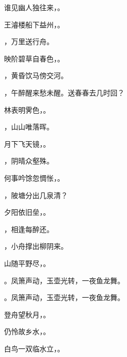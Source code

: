 \documentclass[12pt, a4paper, addpoints]{exam}
\begin{document}
\begin{questions}
\question[1] 谁见幽人独往来，\uline{\qquad\qquad\qquad}。

\question[1] 王濬楼船下益州，\uline{\qquad\qquad\qquad}。

\question[1] \uline{\qquad\qquad\qquad}，万里送行舟。

\question[1] 映阶碧草自春色，\uline{\qquad\qquad\qquad}。

\question[1] \uline{\qquad\qquad\qquad}，黄昏饮马傍交河。

\question[1] \uline{\qquad\qquad\qquad}，午醉醒来愁未醒。送春春去几时回？

\question[1] 林表明霁色，\uline{\qquad\qquad\qquad}。

\question[1] \uline{\qquad\qquad\qquad}，山山唯落晖。

\question[1] 月下飞天镜，\uline{\qquad\qquad\qquad}。

\question[1] \uline{\qquad\qquad\qquad}，阴晴众壑殊。

\question[1] 何事吟馀忽惆怅，\uline{\qquad\qquad\qquad}。

\question[1] \uline{\qquad\qquad\qquad}，陂塘分出几泉清？

\question[1] 夕阳依旧垒，\uline{\qquad\qquad\qquad}。

\question[1] \uline{\qquad\qquad\qquad}，相逢每醉还。

\question[1] \uline{\qquad\qquad\qquad}，小舟撑出柳阴来。

\question[1] 山随平野尽，\uline{\qquad\qquad\qquad}。

\question[1] \uline{\qquad\qquad\qquad}。凤箫声动，玉壶光转，一夜鱼龙舞。

\question[1] \uline{\qquad\qquad\qquad}。凤箫声动，玉壶光转，一夜鱼龙舞。

\question[1] 登舟望秋月，\uline{\qquad\qquad\qquad}。

\question[1] 仍怜故乡水，\uline{\qquad\qquad\qquad}。

\question[1] 白鸟一双临水立，\uline{\qquad\qquad\qquad}。

\end{questions}

\hspace{5cm}
\end{document}
